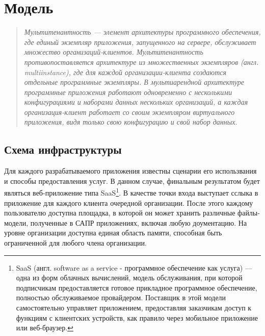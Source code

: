 \section{Модель}

\begin{quote}
\itshape{\large Мультитенантность} --- элемент архитектуры программного обеспечения, где единый экземпляр приложения, запущенного на сервере, обслуживает множество организаций-клиентов. Мультитенантность противопоставляется архитектуре из множественных экземпляров (англ. multiinstance), где для каждой организации-клиента создаются отдельные программные экземпляры. В мультиарендной архитектуре программные приложения работают одновременно с несколькими конфигурациями и наборами данных нескольких организаций, а каждая организация-клиент работает со своим экземпляром виртуального приложения, видя только свою конфигурацию и свой набор данных.
\end{quote}



\vspace{6pt}

\subsection{Схема инфраструктуры}
Для каждого разрабатываемого приложения известны сценарии его использвания и способы предоставления услуг. В данном случае, финальным результатом будет являться веб-приложение типа SaaS\footnote{%
	SaaS (англ. software as a service - программное обеспечение как услуга) --- одна из форм облачных вычислений, модель обслуживания, при которой подписчикам предоставляется готовое прикладное программное обеспечение, полностью обслуживаемое провайдером. Поставщик в этой модели самостоятельно управляет приложением, предоставляя заказчикам доступ к функциям с клиентских устройств, как правило через мобильное приложение или веб-браузер.
}. В качестве точки входа выступает сслыка в приложение для каждого клиента очередной организации. После этого каждому пользователю доступна площадка, в которой он может хранить различные файлы-модели, полученные в САПР приложениях, включая любую доументацию. На уровне организации доступна единая область памяти, способная быть ограниченной для любого члена организации. 

